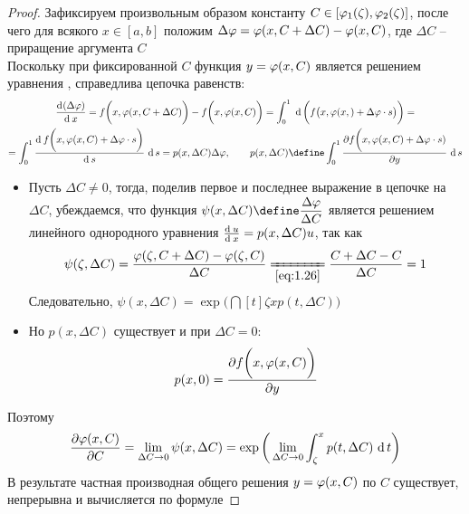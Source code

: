 \begin{proof}
	Зафиксируем произвольным образом константу $ C \in [\vphi_1(\zeta), \vphi_2(\zeta)] $, после чего для всякого $ x \in [a, b] $ положим $ \Delta \vphi = \vphi(x, C + \Delta C) - \vphi(x, C) $, где $ \Delta C $ -- приращение аргумента $ C $ \\
    Поскольку при фиксированной $ C $ функция $ y = \vphi(x, C) $ является решением уравнения , справедлива цепочка равенств:
    \begin{multline*}
        \frac{\di(\Delta \vphi)}{\di x} = f \bigg( x, \vphi(x, C + \Delta C) \bigg) - f \bigg( x, \vphi(x, C) \bigg) = \dint[\bigg( f \big( x, \vphi(x, ) + \Delta \vphi \cdot s \big) \bigg)]01{} = \\
        = \dint[s]01{\frac{\di f \bigg( x, \vphi(x, C) + \Delta \vphi \cdot s \bigg)}{\di s}} = p(x, \Delta C) \Delta \vphi, \qquad p(x, \Delta C) \define \dint[s]01{\pder{f \bigg( x, \vphi(x, C) + \Delta \vphi \cdot s)}y}
    \end{multline*}
    \begin{itemize}
        \item Пусть $ \Delta C \ne 0 $, тогда, поделив первое и последнее выражение в цепочке на $ \Delta C $, убеждаемся, что функция $ \psi(x, \Delta C) \define \dfrac{\Delta \vphi}{\Delta C} $ является решением  линейного однородного уравнения $ \frac{\di u}{\di x} = p(x, \Delta C)u $, так как
        $$ \psi(\zeta, \Delta C) = \frac{\vphi(\zeta, C + \Delta C) - \vphi(\zeta, C)}{\Delta C} \undereq{\eref{1.26}} \frac{C + \Delta C - C}{\Delta C} = 1 $$
        Следовательно, $ \psi(x, \Delta C) = \exp \bigg( \dint[t]\zeta{x}{p(t, \Delta C)} \bigg) $
        \item Но $ p(x, \Delta C) $ существует и при $ \Delta C = 0 $:
        $$ p(x, 0) = \pder{f \bigg( x, \vphi(x, C) \bigg)}y $$
    \end{itemize}
    Поэтому
    $$ \pder{\vphi(x, C)}C = \limz{\Delta C} \psi(x, \Delta C) = \exp \bigg( \limz{\Delta C} \dint[t]\zeta{x}{p(t, \Delta C)} \bigg) $$
    В результате частная производная общего решения $ y = \vphi(x, C) $ по $ C $ существует, непрерывна и вычисляется по формуле 
\end{proof}
